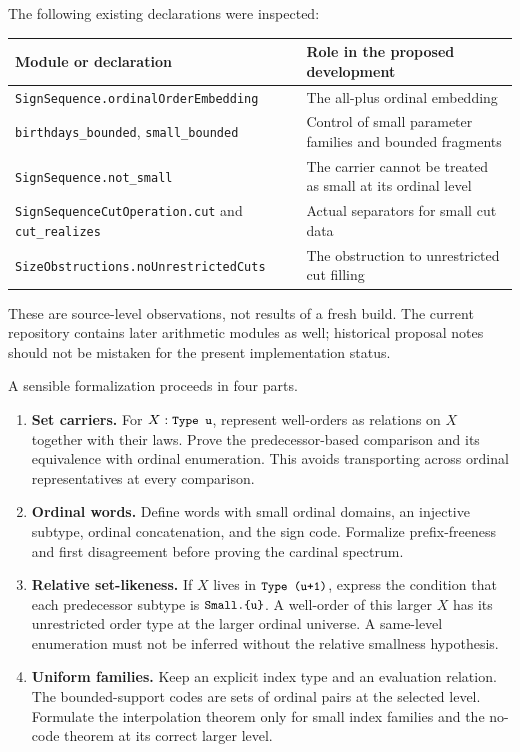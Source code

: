 \documentclass[11pt]{article}
\theoremstyle{definition}
\theoremstyle{remark}
\newcommand{\code}[1]{\texttt{\small #1}}
\begin{document}
The following existing declarations were inspected:
\begin{center}
\small
\begin{tabular}{@{}>{\raggedright\arraybackslash}p{}>{\raggedright\arraybackslash}p{}@{}}
\toprule
Module or declaration & Role in the proposed development\\
\midrule
\code{SignSequence.ordinalOrderEmbedding} &
The all-plus ordinal embedding\\[3pt]
\code{birthdays\_bounded}, \code{small\_bounded} &
Control of small parameter families and bounded fragments\\[3pt]
\code{SignSequence.not\_small} &
The carrier cannot be treated as small at its ordinal level\\[3pt]
\code{SignSequenceCutOperation.cut} and \code{cut\_realizes} &
Actual separators for small cut data\\[3pt]
\code{SizeObstructions.noUnrestrictedCuts} &
The obstruction to unrestricted cut filling\\
\bottomrule
\end{tabular}
\end{center}

These are source-level observations, not results of a fresh
build. The current repository contains later arithmetic
modules as well; historical proposal notes should not be
mistaken for the present implementation status.

A sensible formalization proceeds in four parts.

\begin{enumerate}
\item \textbf{Set carriers.} For \(X:\code{Type u}\), represent
well-orders as relations on \(X\) together with their laws.
Prove the predecessor-based comparison and its equivalence
with ordinal enumeration. This avoids transporting across
ordinal representatives at every comparison.
\item \textbf{Ordinal words.} Define words with small
ordinal domains, an injective subtype, ordinal concatenation,
and the sign code. Formalize prefix-freeness and first
disagreement before proving the cardinal spectrum.
\item \textbf{Relative set-likeness.} If \(X\) lives in
\(\code{Type (u+1)}\), express the condition that each
predecessor subtype is \(\code{Small.\{u\}}\). A well-order
of this larger \(X\) has its unrestricted order type at
the larger ordinal universe. A same-level enumeration must
not be inferred without the relative smallness hypothesis.
\item \textbf{Uniform families.} Keep an explicit index type
and an evaluation relation. The bounded-support codes are
sets of ordinal pairs at the selected level. Formulate the
interpolation theorem only for small index families and
the no-code theorem at its correct larger level.
\end{enumerate}
\end{document}
